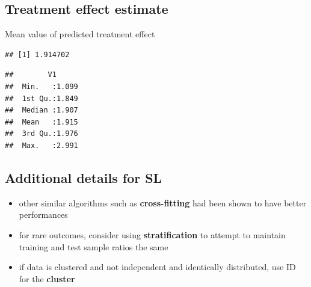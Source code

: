 \documentclass[
]{book}
\newenvironment{Shaded}{\begin{snugshade}}{\end{snugshade}}
\newcommand{\FunctionTok}[1]{\textcolor[rgb]{0.00,0.00,0.00}{#1}}
\newcommand{\NormalTok}[1]{#1}
\newcommand{\OtherTok}[1]{\textcolor[rgb]{0.56,0.35,0.01}{#1}}
\newcommand{\SpecialCharTok}[1]{\textcolor[rgb]{0.00,0.00,0.00}{#1}}
\providecommand{\tightlist}{%
  \setlength{\itemsep}{0pt}\setlength{\parskip}{0pt}}
\begin{document}
\hypertarget{treatment-effect-estimate-3}{%
\subsection{Treatment effect estimate}\label{treatment-effect-estimate-3}}

\begin{Shaded}
\end{Shaded}

Mean value of predicted treatment effect

\begin{Shaded}
\end{Shaded}

\begin{verbatim}
## [1] 1.914702
\end{verbatim}

\begin{Shaded}
\end{Shaded}

\begin{verbatim}
##        V1       
##  Min.   :1.099  
##  1st Qu.:1.849  
##  Median :1.907  
##  Mean   :1.915  
##  3rd Qu.:1.976  
##  Max.   :2.991
\end{verbatim}

\hypertarget{additional-details-for-sl}{%
\subsection{Additional details for SL}\label{additional-details-for-sl}}

\begin{itemize}
\tightlist
\item
  other similar algorithms such as \textbf{cross-fitting} had been shown to have better performances
\item
  for rare outcomes, consider using \textbf{stratification} to attempt to maintain training and test sample ratios the same
\item
  if data is clustered and not independent and identically distributed, use ID for the \textbf{cluster}
\end{itemize}
\end{document}
